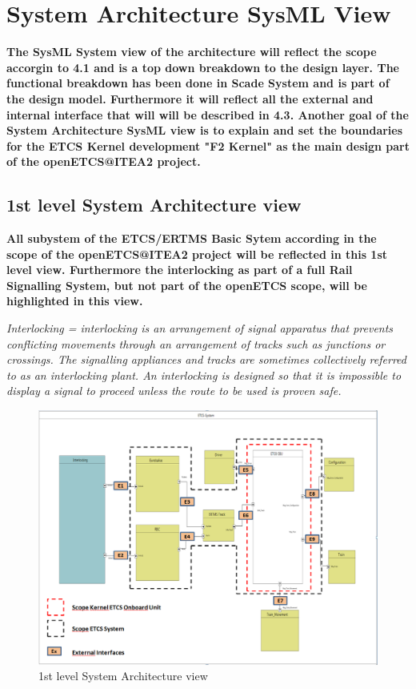 \section{System Architecture SysML View}
\textbf{The SysML System view of the architecture will reflect the scope accorgin to 4.1 and is a top down breakdown to the design layer. The functional breakdown has been done in Scade System and is part of the design model. Furthermore it will reflect all the external and internal interface that will will be described in 4.3. Another goal of the System Architecture SysML view is to explain and set the boundaries for the ETCS Kernel development "F2 Kernel" as the main design part of the openETCS@ITEA2 project.}

\subsection{1st level System Architecture view}
\textbf{All subystem of the ETCS/ERTMS Basic Sytem according in the scope of the openETCS@ITEA2 project will be reflected in this 1st level view. Furthermore the interlocking as part of a full Rail Signalling System, but not part of the openETCS scope, will be highlighted in this view.}

\textit{Interlocking =  interlocking is an arrangement of signal apparatus that prevents conflicting movements through an arrangement of tracks such as junctions or crossings. The signalling appliances and tracks are sometimes collectively referred to as an interlocking plant. An interlocking is designed so that it is impossible to display a signal to proceed unless the route to be used is proven safe.}


\begin{figure}[h]
\centering
\includegraphics[scale=0.6]{images/1stlevelarchitecture}
\caption{1st level System Architecture view}
\label{1st level System Architecture view}
\end{figure}


